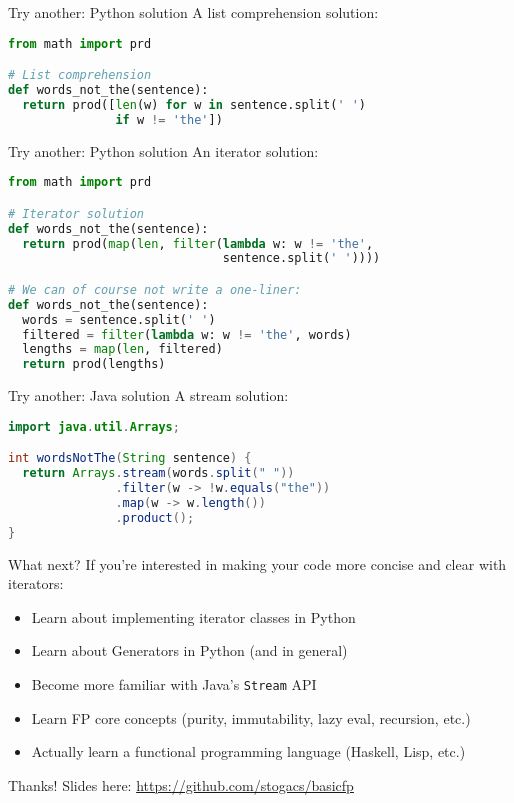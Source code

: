 \documentclass[../index.tex]{subfiles}
\begin{document}
\renewcommand{\currenttitle}{Try another: Python solution}
\begin{frame}[fragile]{\currenttitle}
  A list comprehension solution:

  \begin{lstlisting}[language=Python]
from math import prd

# List comprehension
def words_not_the(sentence):
  return prod([len(w) for w in sentence.split(' ')
               if w != 'the'])
  \end{lstlisting}
\end{frame}

\begin{frame}[fragile]{\currenttitle}
  An iterator solution:

  \begin{lstlisting}[language=Python]
from math import prd

# Iterator solution
def words_not_the(sentence):
  return prod(map(len, filter(lambda w: w != 'the',
                              sentence.split(' '))))

# We can of course not write a one-liner:
def words_not_the(sentence):
  words = sentence.split(' ')
  filtered = filter(lambda w: w != 'the', words)
  lengths = map(len, filtered)
  return prod(lengths)
  \end{lstlisting}
\end{frame}

\renewcommand{\currenttitle}{Try another: Java solution}
\begin{frame}[fragile]{\currenttitle}
  A stream solution:

  \begin{lstlisting}[language=Java]
import java.util.Arrays;

int wordsNotThe(String sentence) {
  return Arrays.stream(words.split(" "))
               .filter(w -> !w.equals("the"))
               .map(w -> w.length())
               .product();
}
  \end{lstlisting}
\end{frame}

\renewcommand{\currenttitle}{What next?}
\begin{frame}{\currenttitle}
  If you're interested in making your code more concise and clear with
  iterators: \\[1em]

  \begin{itemize}
    \item Learn about implementing iterator classes in Python
    \item Learn about Generators in Python (and in general)
    \item Become more familiar with Java's \texttt{Stream} API
    \item Learn FP core concepts (purity, immutability, lazy eval, recursion, etc.)
    \item Actually learn a functional programming language (Haskell, Lisp, etc.)
  \end{itemize}
\end{frame}

\renewcommand{\currenttitle}{Thanks!}
\begin{frame}[fragile]{\currenttitle}
  Slides here: \url{https://github.com/stogacs/basicfp}
\end{frame}
\end{document}
